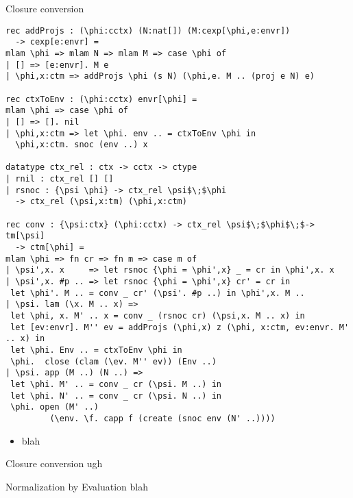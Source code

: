 \documentclass{beamer}
\begin{document}
\begin{frame}[fragile]{Closure conversion}

\begin{lstlisting}
rec addProjs : (\phi:cctx) (N:nat[]) (M:cexp[\phi,e:envr])
  -> cexp[e:envr] =
mlam \phi => mlam N => mlam M => case \phi of
| [] => [e:envr]. M e
| \phi,x:ctm => addProjs \phi (s N) (\phi,e. M .. (proj e N) e)

rec ctxToEnv : (\phi:cctx) envr[\phi] =
mlam \phi => case \phi of
| [] => []. nil
| \phi,x:ctm => let \phi. env .. = ctxToEnv \phi in
  \phi,x:ctm. snoc (env ..) x

datatype ctx_rel : ctx -> cctx -> ctype
| rnil : ctx_rel [] []
| rsnoc : {\psi \phi} -> ctx_rel \psi$\;$\phi
  -> ctx_rel (\psi,x:tm) (\phi,x:ctm)

rec conv : {\psi:ctx} (\phi:cctx) -> ctx_rel \psi$\;$\phi$\;$-> tm[\psi]
  -> ctm[\phi] =
mlam \phi => fn cr => fn m => case m of
| \psi',x. x     => let rsnoc {\phi = \phi',x} _ = cr in \phi',x. x
| \psi',x. #p .. => let rsnoc {\phi = \phi',x} cr' = cr in 
 let \phi'. M .. = conv _ cr' (\psi'. #p ..) in \phi',x. M ..
| \psi. lam (\x. M .. x) =>
 let \phi, x. M' .. x = conv _ (rsnoc cr) (\psi,x. M .. x) in
 let [ev:envr]. M'' ev = addProjs (\phi,x) z (\phi, x:ctm, ev:envr. M' .. x) in
 let \phi. Env .. = ctxToEnv \phi in 
 \phi.  close (clam (\ev. M'' ev)) (Env ..)
| \psi. app (M ..) (N ..) =>
 let \phi. M' .. = conv _ cr (\psi. M ..) in
 let \phi. N' .. = conv _ cr (\psi. N ..) in
 \phi. open (M' ..)
         (\env. \f. capp f (create (snoc env (N' ..))))
\end{lstlisting}
\begin{itemize}
\item blah
\end{itemize}
\end{frame}

\begin{frame}[fragile]{Closure conversion}
ugh
\end{frame}

\begin{frame}[fragile]{Normalization by Evaluation}
blah
\end{frame}
\end{document}
